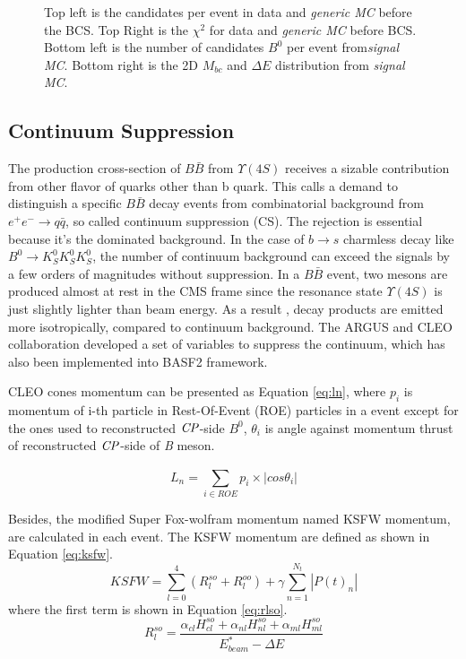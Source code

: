 \begin{figure}[H]
\begin{minipage}[b]{0.5\linewidth}
	\end{minipage}
	
	\caption{Top left is the candidates per event in data and \textit{generic MC} before the BCS. Top Right is the $\chi^2$ for data and \textit{generic MC} before BCS. Bottom left is the number of candidates $B^0$ per event from\textit{signal MC}. Bottom right is the 2D $M_{bc}$ and $\Delta E$ distribution from \textit{signal MC}.}
	\label{fig:b0dist}
\end{figure}

\subsection{Continuum Suppression}
The production cross-section of $B\bar{B}$ from $\Upsilon{(4S)}$ receives a sizable contribution from other flavor of quarks other than b quark. This calls a demand to distinguish a specific $B\bar{B}$ decay events from combinatorial background from $e^+e^- \to q\bar{q}$, so called continuum suppression (CS). The rejection is essential because it's the dominated background.  In the case of $b \to s$ charmless decay like $B^0 \to K_S^0  K_S^0  K_S^0$, the number of continuum background can exceed the signals by a few orders of magnitudes without suppression. In a $B\bar{B}$ event, two mesons are produced almost at rest in the CMS frame since the resonance state $\Upsilon(4S)$ is  just slightly lighter than beam energy. As a result	, decay products are emitted more isotropically, compared to continuum background. The ARGUS and CLEO collaboration\cite{Bevan_2014} developed a set of variables to suppress the continuum, which has also been implemented into BASF2 framework. 

CLEO cones momentum can be presented as Equation \ref{eq:ln}, where $ p_i $ is momentum of i-th particle in Rest-Of-Event (ROE) particles in a event except for the ones used to reconstructed $\it{CP}$-side $B^0$, $\theta_i$ is angle against momentum thrust of reconstructed $\it{CP}$-side of \textit{B} meson.

\begin{equation}\label{eq:ln}
L_n = \sum_{i\in ROE}^{} p_i \times |cos\theta_i|
\end{equation}

Besides, the modified Super Fox-wolfram momentum named  KSFW momentum, are calculated in each event. The KSFW momentum are defined as shown in Equation \ref{eq:ksfw}. 
\begin{equation}\label{eq:ksfw}
KSFW = \sum_{l=0}^{4}( R_l^{so} + R_l^{oo}) + \gamma \sum_{n=1}^{N_t}|P(t)_n|
\end{equation}
where the first term is shown in Equation \ref{eq:rlso}.
\begin{equation}\label{eq:rlso}
R_l^{so} = \frac{\alpha_{cl}H_{cl}^{so} +
				\alpha_{nl}H_{nl}^{so}+
			\alpha_{ml}H_{ml}^{so}}{E^*_{beam}-\Delta E}
\end{equation}

